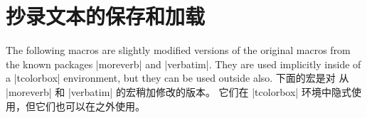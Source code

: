 \section{抄录文本的保存和加载}%
%
\begin{stripedbox}
The following macros are slightly modified versions of the original macros
from the known packages |moreverb| and |verbatim|.
They are used implicitly inside of a |tcolorbox| environment,
but they can be used outside also.
\tcblower
下面的宏是对 从 |moreverb| 和 |verbatim| 的宏稍加修改的版本。%
它们在 |tcolorbox| 环境中隐式使用，但它们也可以在之外使用。
\end{stripedbox}


